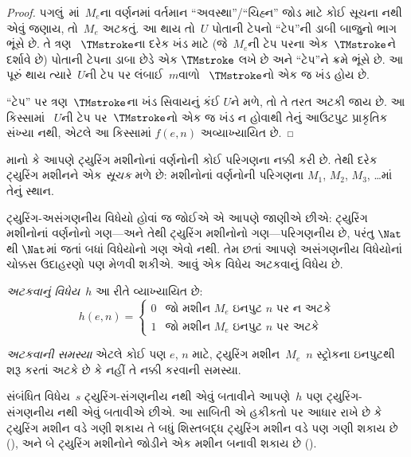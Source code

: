 \begin{proof}
  પગલું~માં~$M_e$ના વર્ણનમાં વર્તમાન
  ``અવસ્થા''/``ચિહ્ન'' જોડ માટે કોઈ સૂચના નથી એવું જણાય,
  તો~$M_e$ અટકતું. આ થાય તો~$U$ પોતાની ટેપનો
  ``ટેપ''ની ડાબી બાજુનો ભાગ ભૂંસે છે. તે ત્રણ
  ~$\TMstroke$ના દરેક ખંડ માટે (જે~$M_e$ની ટેપ પરના
  એક~$\TMstroke$ને દર્શાવે છે) પોતાની ટેપના ડાબા છેડે
  એક $\TMstroke$ લખે છે અને ``ટેપ''ને ક્રમે ભૂંસે છે.
  આ પૂરું થાય ત્યારે~$U$ની ટેપ પર લંબાઈ~$m$વાળો
  ~$\TMstroke$નો એક જ ખંડ હોય છે.

  ``ટેપ'' પર ત્રણ~$\TMstroke$ના ખંડ સિવાયનું કંઈ
  $U$ને મળે, તો તે તરત અટકી જાય છે. આ કિસ્સામાં
  ~$U$ની ટેપ પર~$\TMstroke$નો એક જ ખંડ ન હોવાથી
  તેનું આઉટપુટ પ્રાકૃતિક સંખ્યા નથી, એટલે આ કિસ્સામાં
  $f(e,n)$ અવ્યાખ્યાયિત છે.
\end{proof}
\endgroup


\begingroup
\makeatletter{}\makeatother

\label{guunit:OLP-0268}


\begin{explain}
માનો કે આપણે ટ્યુરિંગ મશીનોનાં વર્ણનોની કોઈ પરિગણના
નક્કી કરી છે. તેથી દરેક ટ્યુરિંગ મશીનને એક
\emph{સૂચક} મળે છે: મશીનોનાં વર્ણનોની પરિગણના
$M_1$, $M_2$, $M_3$, \dots{}માં તેનું સ્થાન.

ટ્યુરિંગ-અસંગણનીય વિધેયો હોવાં જ જોઈએ એ આપણે
જાણીએ છીએ: ટ્યુરિંગ મશીનોનાં વર્ણનોનો ગણ---અને તેથી
ટ્યુરિંગ મશીનોનો ગણ---પરિગણનીય છે, પરંતુ
$\Nat$થી $\Nat$માં જતાં બધાં વિધેયોનો ગણ એવો નથી.
તેમ છતાં આપણે અસંગણનીય વિધેયોનાં ચોક્કસ ઉદાહરણો પણ
મેળવી શકીએ. આવું એક વિધેય અટકવાનું વિધેય છે.
\end{explain}

\begin{defn}[અટકવાનું વિધેય]
 \emph{અટકવાનું વિધેય}~$h$ આ રીતે વ્યાખ્યાયિત છે:
\[
h(e,n) =
\begin{cases}
  \text{0} & \text{જો મશીન~$M_e$ ઇનપુટ $n$ પર ન અટકે} \\
  \text{1} & \text{જો મશીન~$M_e$ ઇનપુટ $n$ પર અટકે}
\end{cases}
\]
\end{defn}

\begin{defn}
\emph{અટકવાની સમસ્યા} એટલે કોઈ પણ $e$, $n$ માટે,
ટ્યુરિંગ મશીન~$M_e$~$n$ સ્ટ્રોકના
ઇનપુટથી શરૂ કરતાં અટકે છે કે નહીં તે નક્કી કરવાની
સમસ્યા.
\end{defn}

\begin{explain}
સંબંધિત વિધેય~$s$ ટ્યુરિંગ-સંગણનીય નથી એવું બતાવીને
આપણે~$h$ પણ ટ્યુરિંગ-સંગણનીય નથી એવું બતાવીએ છીએ.
આ સાબિતી એ હકીકતો પર આધાર રાખે છે કે ટ્યુરિંગ મશીન
વડે ગણી શકાય તે બધું શિસ્તબદ્ધ ટ્યુરિંગ મશીન વડે પણ
ગણી શકાય છે (), અને બે ટ્યુરિંગ
મશીનોને જોડીને એક મશીન બનાવી શકાય છે
().
\end{explain}

